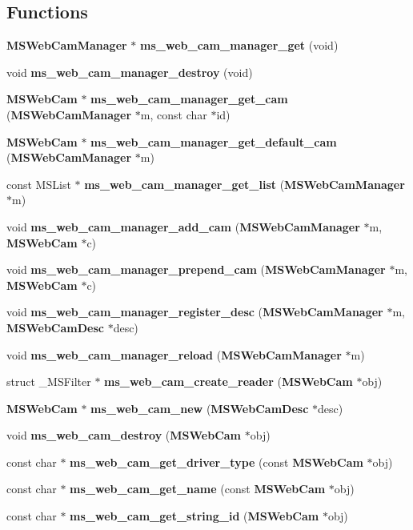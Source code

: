\subsection*{Functions}
\begin{DoxyCompactItemize}
\item 
{\bf M\-S\-Web\-Cam\-Manager} $\ast$ {\bf ms\-\_\-web\-\_\-cam\-\_\-manager\-\_\-get} (void)
\item 
void {\bf ms\-\_\-web\-\_\-cam\-\_\-manager\-\_\-destroy} (void)
\item 
{\bf M\-S\-Web\-Cam} $\ast$ {\bf ms\-\_\-web\-\_\-cam\-\_\-manager\-\_\-get\-\_\-cam} ({\bf M\-S\-Web\-Cam\-Manager} $\ast$m, const char $\ast$id)
\item 
{\bf M\-S\-Web\-Cam} $\ast$ {\bf ms\-\_\-web\-\_\-cam\-\_\-manager\-\_\-get\-\_\-default\-\_\-cam} ({\bf M\-S\-Web\-Cam\-Manager} $\ast$m)
\item 
const M\-S\-List $\ast$ {\bf ms\-\_\-web\-\_\-cam\-\_\-manager\-\_\-get\-\_\-list} ({\bf M\-S\-Web\-Cam\-Manager} $\ast$m)
\item 
void {\bf ms\-\_\-web\-\_\-cam\-\_\-manager\-\_\-add\-\_\-cam} ({\bf M\-S\-Web\-Cam\-Manager} $\ast$m, {\bf M\-S\-Web\-Cam} $\ast$c)
\item 
void {\bf ms\-\_\-web\-\_\-cam\-\_\-manager\-\_\-prepend\-\_\-cam} ({\bf M\-S\-Web\-Cam\-Manager} $\ast$m, {\bf M\-S\-Web\-Cam} $\ast$c)
\item 
void {\bf ms\-\_\-web\-\_\-cam\-\_\-manager\-\_\-register\-\_\-desc} ({\bf M\-S\-Web\-Cam\-Manager} $\ast$m, {\bf M\-S\-Web\-Cam\-Desc} $\ast$desc)
\item 
void {\bf ms\-\_\-web\-\_\-cam\-\_\-manager\-\_\-reload} ({\bf M\-S\-Web\-Cam\-Manager} $\ast$m)
\item 
struct \-\_\-\-M\-S\-Filter $\ast$ {\bf ms\-\_\-web\-\_\-cam\-\_\-create\-\_\-reader} ({\bf M\-S\-Web\-Cam} $\ast$obj)
\item 
{\bf M\-S\-Web\-Cam} $\ast$ {\bf ms\-\_\-web\-\_\-cam\-\_\-new} ({\bf M\-S\-Web\-Cam\-Desc} $\ast$desc)
\item 
void {\bf ms\-\_\-web\-\_\-cam\-\_\-destroy} ({\bf M\-S\-Web\-Cam} $\ast$obj)
\item 
const char $\ast$ {\bf ms\-\_\-web\-\_\-cam\-\_\-get\-\_\-driver\-\_\-type} (const {\bf M\-S\-Web\-Cam} $\ast$obj)
\item 
const char $\ast$ {\bf ms\-\_\-web\-\_\-cam\-\_\-get\-\_\-name} (const {\bf M\-S\-Web\-Cam} $\ast$obj)
\item 
const char $\ast$ {\bf ms\-\_\-web\-\_\-cam\-\_\-get\-\_\-string\-\_\-id} ({\bf M\-S\-Web\-Cam} $\ast$obj)
\end{DoxyCompactItemize}


